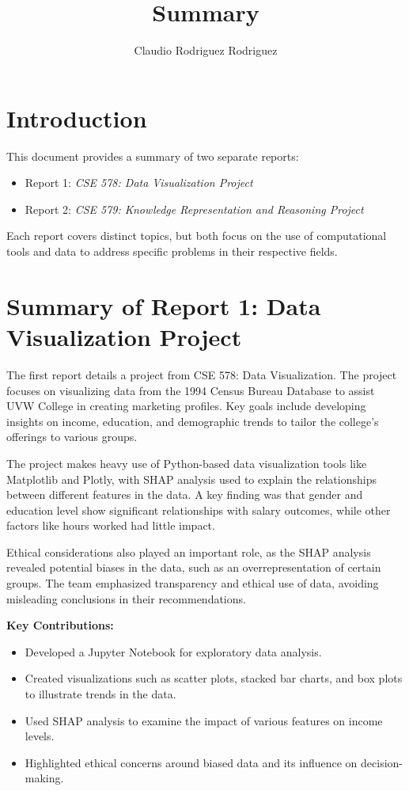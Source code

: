 \documentclass{IEEEtran}
\begin{document}
\title{Summary}
\author{Claudio Rodriguez Rodriguez}
\maketitle


\section{Introduction}
This document provides a summary of two separate reports: 
\begin{itemize}
    \item Report 1: \textit{CSE 578: Data Visualization Project}
    \item Report 2: \textit{CSE 579: Knowledge Representation and Reasoning Project}
\end{itemize}
Each report covers distinct topics, but both focus on the use of computational tools and data to address specific problems in their respective fields.

\section{Summary of Report 1: Data Visualization Project}
The first report details a project from CSE 578: Data Visualization. The project focuses on visualizing data from the 1994 Census Bureau Database to assist UVW College in creating marketing profiles. Key goals include developing insights on income, education, and demographic trends to tailor the college's offerings to various groups.

The project makes heavy use of Python-based data visualization tools like Matplotlib and Plotly, with SHAP analysis used to explain the relationships between different features in the data. A key finding was that gender and education level show significant relationships with salary outcomes, while other factors like hours worked had little impact.

Ethical considerations also played an important role, as the SHAP analysis revealed potential biases in the data, such as an overrepresentation of certain groups. The team emphasized transparency and ethical use of data, avoiding misleading conclusions in their recommendations.

\textbf{Key Contributions:}
\begin{itemize}
    \item Developed a Jupyter Notebook for exploratory data analysis.
    \item Created visualizations such as scatter plots, stacked bar charts, and box plots to illustrate trends in the data.
    \item Used SHAP analysis to examine the impact of various features on income levels.
    \item Highlighted ethical concerns around biased data and its influence on decision-making.
\end{itemize}
\end{document}
